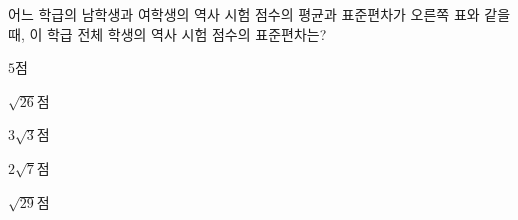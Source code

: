 \noindent\begin{minipage}[t]{0.58\linewidth}\vspace{0pt}\raggedright 어느 학급의 남학생과 여학생의 역사 시험 점수의 평균과 표준편차가 오른쪽 표와 같을 때, 이 학급 전체 학생의 역사 시험 점수의 표준편차는?\end{minipage}\hfill\begin{minipage}[t]{0.4\linewidth}\vspace{0pt}\centering \resizebox{\ifdim\width>\linewidth\linewidth\else\width\fi}{!}{}\end{minipage}\par
\begin{choices32}{\rule[-3ex]{0pt}{8ex}$5$점}{\rule[-3ex]{0pt}{8ex}$\sqrt{26}$점}{\rule[-3ex]{0pt}{8ex}$3\sqrt{3}$점}{\rule[-3ex]{0pt}{8ex}$2\sqrt{7}$점}{\rule[-3ex]{0pt}{8ex}$\sqrt{29}$점}\end{choices32}
